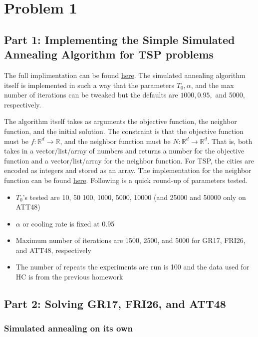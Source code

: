 \section*{Problem 1}

\subsection*{Part 1: Implementing the Simple Simulated Annealing Algorithm for TSP problems}

The full implimentation can be found \href{https://github.com/nngerncham/ma395_heuristic/tree/main/homework/hw2/code/simulated_annealing}{here}. The simulated annealing algorithm itself is implemented in such a way that the parameters \(T_0, \alpha\), and the max number of iterations can be tweaked but the defaults are \(1000, 0.95,\) and 5000, respectively.

The algorithm itself takes as arguments the objective function, the neighbor function, and the initial solution. The constraint is that the objective function must be \(f: \mathbb{R}^d \to \mathbb{R}\), and the neighbor function must be \(N: \mathbb{R}^d \to \mathbb{R}^d\). That is, both takes in a vector/list/array of numbers and returns a number for the objective function and a vector/list/array for the neighbor function. For TSP, the cities are encoded as integers and stored as an array. The implementation for the neighbor function can be found \href{https://github.com/nngerncham/ma395_heuristic/blob/main/homework/hw2/code/simulated_annealing/tsp_neighbors.py}{here}. Following is a quick round-up of parameters tested.
\begin{itemize}
    \item \(T_0\)'s tested are 10, 50 100, 1000, 5000, 10000 (and 25000 and 50000 only on ATT48)
    \item \(\alpha\) or cooling rate is fixed at 0.95
    \item Maximum number of iterations are 1500, 2500, and 5000 for GR17, FRI26, and ATT48, respectively
    \item The number of repeats the experiments are run is 100 and the data used for HC is from the previous homework
\end{itemize}

\subsection*{Part 2: Solving GR17, FRI26, and ATT48}

\subsubsection*{Simulated annealing on its own}

